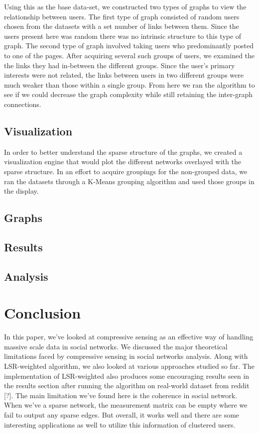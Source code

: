 \documentclass{article}
\begin{document}
Using this as the base data-set, we constructed two types of graphs to view the relationship between users. The first type of graph consisted of random users chosen from the datasets with a set number of links between them. Since the users present here was random there was no intrinsic structure to this type of graph. The second type of graph involved taking users who predominantly posted to one of the pages. After acquiring several such groups of users, we examined the the links they had in-between the different groups. Since the user's primary interests were not related, the links between users in two different groups were much weaker than those within a single group. From here we ran the algorithm to see if we could decrease the graph complexity while still retaining the inter-graph connections.

\subsection{Visualization}
In order to better understand the sparse structure of the graphs, we created a visualization engine that would plot the different networks overlayed with the sparse structure. In an effort to acquire groupings for the non-grouped data, we ran the datasets through a K-Means grouping algorithm and used those groups in the display.

\subsection{Graphs}

\subsection{Results}

\subsection{Analysis}

\section{Conclusion}
In this paper, we've looked at compressive sensing as an effective way of handling massive scale data in social
networks. We discussed the major theoretical limitations faced by compressive sensing in social networks analysis. Along
with LSR-weighted algorithm, we also looked at various approaches studied so far. The implementation of LSR-weighted
also produces some encouraging results seen in the results section after running the algorithm on real-world dataset
from reddit [?]. The main limitation we've found here is the
coherence in social network. When we've a sparse network, the measurement matrix can be empty where we fail to output
any sparse edges. But overall, it works well and there are some interesting applications as well to utilize this
information of clustered users. 
\end{document}
